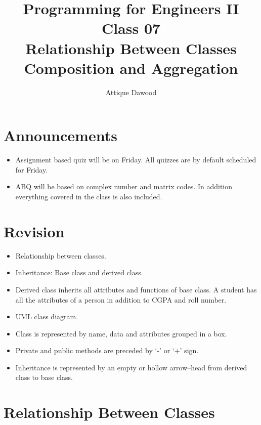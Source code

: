 \documentclass[12pt,a4paper]{article}
\title{\vspace{-2cm}Programming for Engineers II\\Class 07\\Relationship Between Classes\\Composition and Aggregation}
\author{Attique Dawood}
\begin{document}
\maketitle
\section{Announcements}
\begin{itemize}
\item Assignment based quiz will be on Friday. All quizzes are by default scheduled for Friday.
\item ABQ will be based on complex number and matrix codes. In addition everything covered in the class is also included.
\end{itemize}
\section{Revision}
\begin{itemize}
\item Relationship between classes.
\item Inheritance: Base class and derived class.
\item Derived class inherits all attributes and functions of base class. A student has all the attributes of a person in addition to CGPA and roll number.
\item UML class diagram.
\item Class is represented by name, data and attributes grouped in a box.
\item Private and public methods are preceded by `-' or `+' sign.
\item Inheritance is represented by an empty or hollow arrow--head from derived class to base class.
\end{itemize}
\section{Relationship Between Classes}
\end{document}
